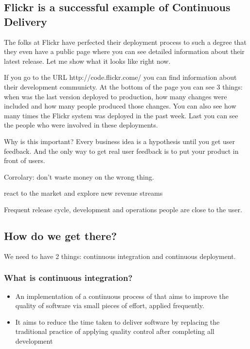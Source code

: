 \documentclass{article}
\begin{document}
\subsection{Flickr is a successful example of Continuous Delivery}

The folks at Flickr have perfected their deployment process to such a
degree that they even have a public page where you can see detailed
information about their latest release.
%
Let me show what it looks like right now.

If you go to the URL http://code.flickr.come/ you can find information
about their development communicty.
%
At the bottom of the page you can see 3 things: when was the last
version deployed to production, how many changes were included and how
many people produced those changes.
%
You can also see how many times the Flickr system was deployed in the
past week.
%
Last you can see the people who were involved in these deployments.

Why is this important?
%
Every business idea is a hypothesis until you get user feedback.
%
And the only way to get real user feedback is to put your product in
front of users.
%

Corrolary: don't waste money on the wrong thing.

react to the market and explore new revenue streams

Frequent release cycle, development and operations people are close to
the user.


\subsection{How do we get there?}

We need to have 2 things: continuous integration and continuous
deployment.

\subsubsection*{What is continuous integration?}
\begin{itemize}
  \item An implementation of a continuous process of that aims to
    improve the quality of software via small pieces of effort,
    applied frequently.
  \item It aims to reduce the time taken to deliver software by
    replacing the traditional practice of applying quality control
    after completing all development
\end{itemize}
\end{document}
